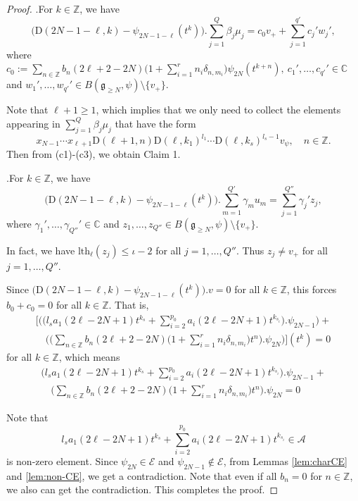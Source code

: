 \documentclass[10pt,a4paper]{amsart}
\newcommand{\C}{\mathbb{C}}
\newcommand{\Z}{\mathbb Z}
\newcommand{\fg}{\mathfrak g}
\newcommand{\rD}{\mathrm{D}}
\begin{document}
\begin{proof}
\vspace{2mm}

.\quad For $k\in\Z$, we have
$$\big(\rD(2N-1-\ell,k)-\psi_{2N-1-\ell}(t^{k})\big).\sum_{j=1}^{Q}\beta_{j}\mu_{j}=c_{0}v_{+}+\sum_{j=1}^{q'}c_{j}'w_{j}',$$
where $c_{0}:=\sum_{n\in\Z}b_{n}(2\ell+2-2N)\big(1+\sum_{i=1}^{r}n_{i}\delta_{n,m_{i}}\big)\psi_{2N}(t^{k+n}),\ c_{1}',\dots,
c_{q'}'\in\C$
and $w_{1}',\dots,w_{q'}'\in B(\fg_{\geq N},\psi)\setminus\{v_{+}\}$.

Note that $\ell+1\geq1$, which implies that we only need to collect the elements
appearing in $\sum_{j=1}^{Q}\beta_{j}\mu_{j}$ that have the form
\[x_{N-1}\cdots x_{\ell+1}\rD(\ell+1,n)\rD(\ell,k_{1})^{l_{1}}\cdots\rD(\ell,k_{s})^{l_{s}-1}v_{\psi},\quad n\in\Z.\]
Then from (c1)-(c3), we obtain Claim 1.




.\quad For $k\in\Z$, we have
$$\big(\rD(2N-1-\ell,k)-\psi_{2N-1-\ell}(t^{k})\big).\sum_{m=1}^{Q'}\gamma_{m}u_{m}=\sum_{j=1}^{Q''}\gamma_{j}'z_{j},$$
where $\gamma_{1}',\dots,\gamma_{Q''}'\in\C$ and $z_{1},\dots,z_{Q''}\in B(\fg_{\geq N},\psi)\setminus\{v_{+}\}$.

In fact, we have $\mathrm{lth}_{\ell}(z_{j})\leq\iota-2$ for all $j=1,\dots,Q''$.
Thus $z_{j}\neq v_{+}$ for all $j=1,\dots,Q''$.

\vspace{3mm}

Since $\big(\rD(2N-1-\ell,k)-\psi_{2N-1-\ell}(t^{k})\big).v=0$ for all $k\in\Z$, this forces
$b_{0}+c_{0}=0$ for all $k\in\Z$.
That is,
$$\begin{aligned}
\Big[\Big(\big(l_{s}a_{1}(2\ell-2N+1)t^{k_{s}}+\sum_{i=2}^{p_{0}}a_{i}(2\ell-2N+1)t^{k_{s_{i}}}\big).\psi_{2N-1}\Big)
+\\ \quad \Big(\big(\sum_{n\in\Z}b_{n}(2\ell+2-2N)\big(1+\sum_{i=1}^{r}n_{i}\delta_{n,m_{i}}\big)t^{n}\big).\psi_{2N}\Big)\Big](t^{k})=0
\end{aligned}$$
for all $k\in\Z$, which means
$$\begin{aligned}
\Big(l_{s}a_{1}(2\ell-2N+1)t^{k_{s}}+\sum_{i=2}^{p_{0}}a_{i}(2\ell-2N+1)t^{k_{s_{i}}}\Big).\psi_{2N-1}
+\\ \quad \Big(\sum_{n\in\Z}b_{n}(2\ell+2-2N)\big(1+\sum_{i=1}^{r}n_{i}\delta_{n,m_{i}}\big)t^{n}\Big).\psi_{2N}=0
\end{aligned}$$

Note that \[l_{s}a_{1}(2\ell-2N+1)t^{k_{s}}+\sum_{i=2}^{p_{0}}a_{i}(2\ell-2N+1)t^{k_{s_{i}}}\in\mathcal{A}\]
is non-zero element. Since $\psi_{2N}\in\mathcal{E}$ and $\psi_{2N-1}\notin\mathcal{E}$,
from Lemmas \ref{lem:charCE} and \ref{lem:non-CE}, we get a contradiction.
Note that even if all $b_{n}=0$ for $n\in\Z$, we also can get the contradiction. This completes the proof.
\end{proof}
\end{document}
